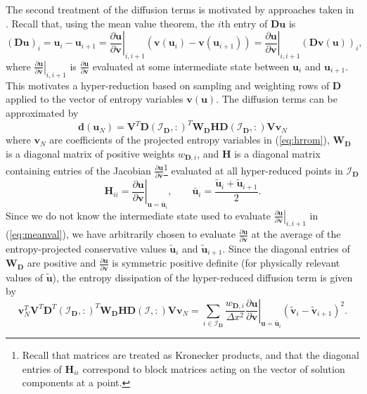 \documentclass[preprint,10pt]{elsarticle}
\theoremstyle{definition}
\theoremstyle{lemma}
\theoremstyle{theorem}
\theoremstyle{assumption}
\renewcommand{\tilde}{\widetilde}
\newcommand{\pd}[2]{\frac{\partial#1}{\partial#2}}
\newcommand{\LRp}[1]{\left( #1 \right)}
\newcommand{\LRl}[1]{\left. #1 \right|}
\begin{document}
The second treatment of the diffusion terms is motivated by approaches taken in \cite{carpenter2014entropy, chen2017entropy, zakerzadeh2017entropy, upperman2019entropy}.  Recall that, using the mean value theorem, the $i$th entry of $\bm{D}\bm{u}$ is
\begin{equation}
\LRp{\bm{D}\bm{u}}_i = \bm{u}_i - \bm{u}_{i+1} = \LRl{\pd{\bm{u}}{\bm{v}}}_{i,i+1} \LRp{\bm{v}(\bm{u}_i)-\bm{v}(\bm{u}_{i+1})} = \LRl{\pd{\bm{u}}{\bm{v}}}_{i,i+1}  \LRp{\bm{D}\bm{v}(\bm{u})}_i,
\label{eq:meanval}
\end{equation}
where $\LRl{\pd{\bm{u}}{\bm{v}}}_{i,i+1}$ is $\pd{\bm{u}}{\bm{v}}$ evaluated at some intermediate state between $\bm{u}_i$ and $\bm{u}_{i+1}$.  This motivates a hyper-reduction based on sampling and weighting rows of $\bm{D}$ applied to the vector of entropy variables $\bm{v}(\bm{u})$.  The diffusion terms can be approximated by 
\begin{equation}
\bm{d}(\bm{u}_N) = \bm{V}^T\bm{D}\LRp{\mathcal{I}_{\bm{D}},:}^T \bm{W}_{\bm{D}} \bm{H} \bm{D}\LRp{\mathcal{I}_{\bm{D}},:}\bm{V} \bm{v}_N
\label{eq:visc2}
\end{equation}
where $\bm{v}_N$ are coefficients of the projected entropy variables in (\ref{eq:hrrom}), $\bm{W}_{\bm{D}}$ is a diagonal matrix of positive weights $w_{\bm{D},i}$, and $\bm{H}$ is a diagonal matrix containing entries of the Jacobian $\pd{\bm{u}}{\bm{v}}$\footnote{Recall that matrices are treated as Kronecker products, and that the diagonal entries of $\bm{H}_{ii}$ correspond to block matrices acting on the vector of solution components at a point.} evaluated at all hyper-reduced points in $\mathcal{I}_{\bm{D}}$ 
\[
\bm{H}_{ii} = \LRl{\pd{\bm{u}}{\bm{v}}}_{\bm{u} = \bar{\bm{u}}_i}, \qquad \bar{\bm{u}}_i = \frac{\tilde{\bm{u}}_i + \tilde{\bm{u}}_{i+1}}{2}.
\]
Since we do not know the intermediate state used to evaluate $\LRl{\pd{\bm{u}}{\bm{v}}}_{i,i+1}$ in (\ref{eq:meanval}), 
we have arbitrarily chosen to evaluate $\pd{\bm{u}}{\bm{v}}$ at the average of the entropy-projected conservative values $\tilde{\bm{u}}_i$ and $\tilde{\bm{u}}_{i+1}$.  Since the diagonal entries of $\bm{W}_{\bm{D}}$ are positive and $\pd{\bm{u}}{\bm{v}}$ is symmetric positive definite (for physically relevant values of $\tilde{\bm{u}}$), the entropy dissipation of the hyper-reduced diffusion term is given by
\[
\bm{v}_N^T\bm{V}^T\bm{D}^T\LRp{\mathcal{I}_{\bm{D}},:}^T \bm{W}_{\bm{D}} \bm{H} \bm{D}\LRp{\mathcal{I},:}\bm{V} \bm{v}_N = 
\sum_{i\in \mathcal{I}_{\bm{D}}} \frac{w_{\bm{D},i}}{\Delta x^2} \LRl{\pd{\bm{u}}{\bm{v}}}_{\bm{u}=\bar{\bm{u}}_i} \LRp{\tilde{\bm{v}}_i - \tilde{\bm{v}}_{i+1}}^2.
\]
\end{document}
